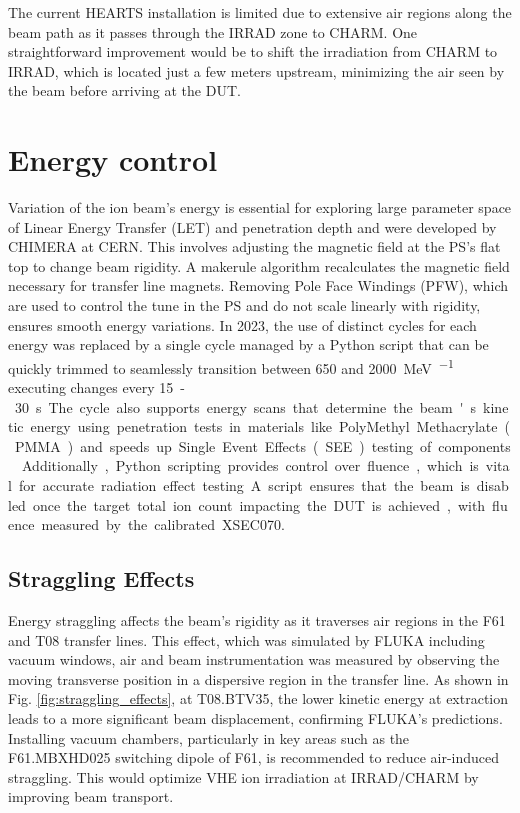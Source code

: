 \documentclass[a4paper,
               biblatex,     %
               ]{jacow}
\begin{document}
The current HEARTS installation is limited due to extensive air regions along the beam path as it passes through the IRRAD zone to CHARM. One straightforward improvement would be to shift the irradiation from CHARM to IRRAD, which is located just a few meters upstream, minimizing the air seen by the beam before arriving at the DUT.






\section{Energy control}

Variation of the ion beam’s energy is essential for exploring large parameter space of Linear Energy Transfer (LET) and penetration depth and were developed by CHIMERA at CERN. This involves adjusting the magnetic field at the PS's flat top to change beam rigidity. A makerule algorithm recalculates the magnetic field necessary for transfer line magnets. Removing Pole Face Windings (PFW), which are used to control the tune in the PS and do not scale linearly with rigidity, ensures smooth energy variations. In 2023, the use of distinct cycles for each energy was replaced by a single cycle managed by a Python script that can be quickly trimmed to seamlessly transition between \SI{650}{} and \SI{2000}{\mega\electronvolt\per\nucleon} executing changes every \SI{15}-\SI{30}{\second}. The cycle also supports energy scans that determine the beam's kinetic energy using penetration tests in materials like PolyMethyl Methacrylate (PMMA) and speeds up Single Event Effects (SEE) testing of components \cite{noauthor_hearts_nodate}. Additionally, Python scripting provides control over fluence, which is vital for accurate radiation effect testing. A script ensures that the beam is disabled once the target total ion count impacting the DUT is achieved, with fluence measured by the calibrated XSEC070.

\subsection{Straggling Effects}
Energy straggling affects the beam's rigidity as it traverses air regions in the F61 and T08 transfer lines. This effect, which was simulated by FLUKA including vacuum windows, air and beam instrumentation \cite{battistoni_overview_2015} was measured by observing the moving transverse position in a dispersive region in the transfer line. As shown in Fig. \ref{fig:straggling_effects}, at T08.BTV35, the lower kinetic energy at extraction leads to a more significant beam displacement, confirming FLUKA's predictions. Installing vacuum chambers, particularly in key areas such as the F61.MBXHD025 switching dipole of F61, is recommended to reduce air-induced straggling. This would optimize VHE ion irradiation at IRRAD/CHARM by improving beam transport.
\end{document}
